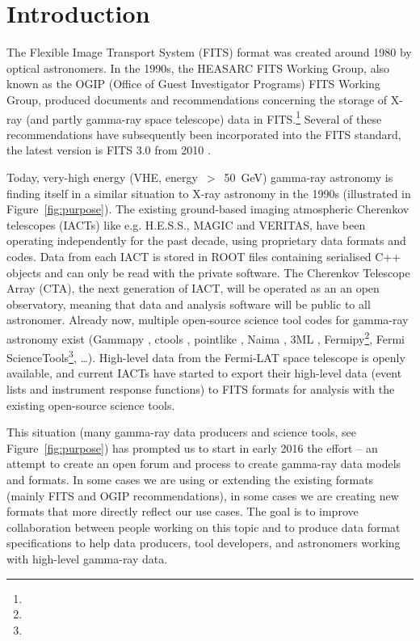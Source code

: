 \section{Introduction}

The Flexible Image Transport System (FITS) format was created around 1980 \cite{Wells:1981} by optical astronomers. In the 1990s, the HEASARC FITS Working Group, also known as the OGIP (Office of Guest Investigator Programs) FITS Working Group, produced documents and recommendations concerning the storage of X-ray (and partly gamma-ray space telescope) data in FITS.\footnote{\ogip} Several of these recommendations have subsequently been incorporated into the FITS standard, the latest version is FITS 3.0 from 2010 \cite{Pence:2010}.

Today, very-high energy (VHE, energy~$>$~50~GeV) gamma-ray astronomy is finding itself in a similar situation to X-ray astronomy in the 1990s (illustrated in Figure~\ref{fig:purpose}). The existing ground-based imaging atmospheric Cherenkov telescopes (IACTs) like e.g. H.E.S.S., MAGIC and VERITAS, have been operating independently for the past decade, using proprietary data formats and codes. Data from each IACT is stored in ROOT files containing serialised C++ objects and can only be read with the private software. The Cherenkov Telescope Array (CTA), the next generation of IACT, will be operated as an an open observatory, meaning that data and analysis software will be public to all astronomer. Already now, multiple open-source science tool codes for gamma-ray astronomy exist (Gammapy \cite{2015arXiv150907408D}, ctools \cite{2016AnA...593A...1K}, pointlike \citep{2010PhDT.......147K}, Naima \citep{2015arXiv150903319Z}, 3ML \citep{2015arXiv150708343V}, Fermipy\footnote{\fermipy}, Fermi ScienceTools\footnote{\fermist}, \ldots). High-level data from the Fermi-LAT space telescope is openly available, and current IACTs have started to export their high-level data (event lists and instrument response functions) to FITS formats for analysis with the existing open-source science tools.

This situation (many gamma-ray data producers and science tools, see Figure~\ref{fig:purpose}) has prompted us to start in early 2016 the \gadf effort -- an attempt to create an open forum and process to create gamma-ray data models and formats. In some cases we are using or extending the existing formats (mainly FITS and OGIP recommendations), in some cases we are creating new formats that more directly reflect our use cases. The goal is to improve collaboration between people working on this topic and to produce data format specifications to help data producers, tool developers, and astronomers working with high-level gamma-ray data.

